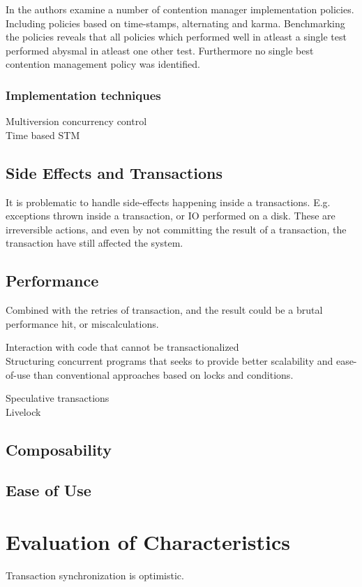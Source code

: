 In \cite{scherer2004contention} the authors examine a number of contention manager implementation policies. Including policies based on time-stamps, alternating and karma. Benchmarking the policies reveals that all policies which performed well in atleast a single test performed abysmal in atleast one other test. Furthermore no single best contention management policy was identified.
\subsubsection{Implementation techniques}
Multiversion concurrency control\\
Time based STM\\


\subsection{Side Effects and Transactions}
It is problematic to handle side-effects happening inside a transactions. E.g. exceptions thrown inside a transaction, or \ac{IO} performed on a disk. These are irreversible actions, and even by not committing the result of a transaction, the transaction have still affected the system. 

\subsection{Performance}
Combined with the retries of transaction, and the result could be a brutal performance hit, or miscalculations.

Interaction with code that cannot be transactionalized\\

Structuring concurrent programs that seeks to provide better scalability and ease-of-use than conventional approaches based on locks and conditions.


Speculative transactions\\
Livelock\\

\subsection{Composability}
\subsection{Ease of Use}

\section{Evaluation of Characteristics}
Transaction synchronization is optimistic\cite[p. 1]{guerraoui2005toward}.

